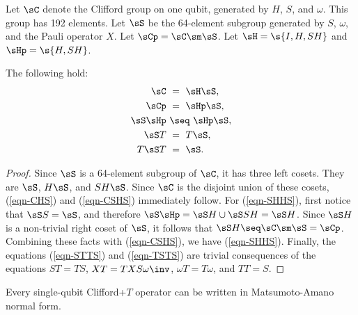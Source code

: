 \documentclass{article}
\begin{document}
\begin{definition}\label{def-sC}
  Let $\sC$ denote the Clifford group on one qubit, generated by $H$,
  $S$, and $\omega$. This group has 192 elements. Let $\sS$ be the
  64-element subgroup generated by $S$, $\omega$, and the Pauli
  operator $X$. Let $\sCp = \sC\sm\sS$. Let
  $\sH = \s{I,H,SH}$ and $\sHp = \s{H,SH}$.
\end{definition}

\begin{lemma}\label{lem-SH}
  The following hold:
  \begin{align}
    \sC ~&=~ \sH\sS,\label{eqn-CHS}\\
    \sCp ~&=~ \sHp\sS,\label{eqn-CSHS}\\
    \sS\sHp ~&\seq~ \sHp\sS,\label{eqn-SHHS}\\
    \sS T ~&=~ T \sS,\label{eqn-STTS}\\
    T \sS T ~&=~ \sS.\label{eqn-TSTS}
  \end{align}
\end{lemma}

\begin{proof}
  Since $\sS$ is a 64-element subgroup of $\sC$, it has three left
  cosets. They are $\sS$, $H\sS$, and $SH\sS$. Since $\sC$ is the
  disjoint union of these cosets, (\ref{eqn-CHS}) and (\ref{eqn-CSHS})
  immediately follow. For (\ref{eqn-SHHS}), first notice that $\sS
  S=\sS$, and therefore $\sS\sHp = \sS H\cup \sS SH = \sS H$. Since
  $\sS H$ is a non-trivial right coset of $\sS$, it follows that $\sS
  H \seq \sC\sm\sS = \sCp$. Combining these facts with
  (\ref{eqn-CSHS}), we have (\ref{eqn-SHHS}). Finally, the equations
  (\ref{eqn-STTS}) and (\ref{eqn-TSTS}) are trivial consequences of
  the equations $ST=TS$, $XT=TXS\omega\inv$, $\omega T=T\omega$, and $TT=S$.
\end{proof}

\begin{theorem}\label{thm-ex}
  Every single-qubit Clifford+$T$ operator can be written in
  Matsumoto-Amano normal form.
\end{theorem}
\end{document}
